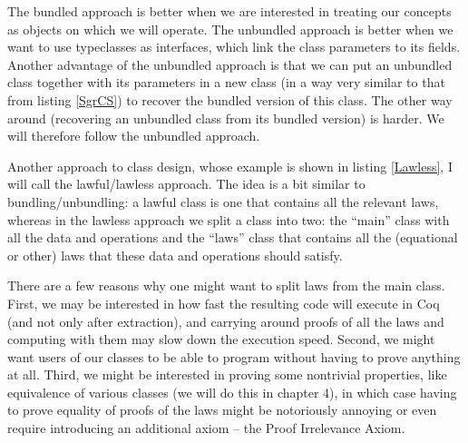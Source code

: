 \documentclass[declaration,inz,english,shortabstract]{iithesis}
\begin{document}
The bundled approach is better when we are interested in treating our concepts as objects on which we will operate. The unbundled approach is better when we want to use typeclasses as interfaces, which link the class parameters to its fields. Another advantage of the unbundled approach is that we can put an unbundled class together with its parameters in a new class (in a way very similar to that from listing \ref{SgrCS}) to recover the bundled version of this class. The other way around (recovering an unbundled class from its bundled version) is harder. We will therefore follow the unbundled approach.


Another approach to class design, whose example is shown in listing \ref{Lawless}, I will call the lawful/lawless approach. The idea is a bit similar to bundling/unbundling: a lawful class is one that contains all the relevant laws, whereas in the lawless approach we split a class into two: the ``main'' class with all the data and operations and the ``laws'' class that contains all the (equational or other) laws that these data and operations should satisfy.

There are a few reasons why one might want to split laws from the main class. First, we may be interested in how fast the resulting code will execute in Coq (and not only after extraction), and carrying around proofs of all the laws and computing with them may slow down the execution speed. Second, we might want users of our classes to be able to program without having to prove anything at all. Third, we might be interested in proving some nontrivial properties, like equivalence of various classes (we will do this in chapter 4), in which case having to prove equality of proofs of the laws might be notoriously annoying or even require introducing an additional axiom -- the Proof Irrelevance Axiom.
\end{document}
